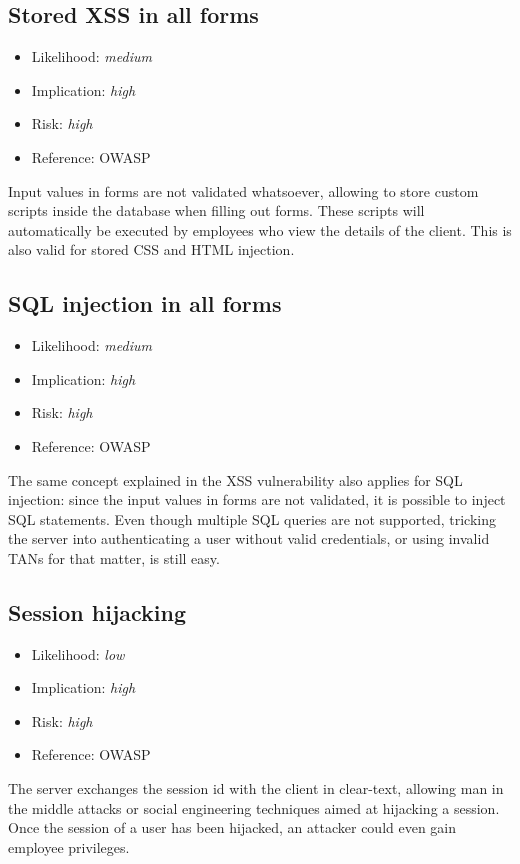 \subsection{Stored XSS in all forms} \label{over:xss}
\begin{itemize}
	\item Likelihood: \textit{medium}
	\item Implication: \textit{high}
	\item Risk: \textit{high}
	\item Reference: OWASP 
\end{itemize}
Input values in forms are not validated whatsoever, allowing to store custom scripts inside the database when filling out forms. These scripts will automatically be executed by employees who view the details of the client. This is also valid for stored CSS and HTML injection.

\subsection{SQL injection in all forms} \label{over:sql}
\begin{itemize}
	\item Likelihood: \textit{medium}
	\item Implication: \textit{high}
	\item Risk: \textit{high}
	\item Reference: OWASP 
\end{itemize}
The same concept explained in the XSS vulnerability also applies for SQL injection: since the input values in forms are not validated, it is possible to inject SQL statements. Even though multiple SQL queries are not supported, tricking the server into authenticating a user without valid credentials, or using invalid TANs for that matter, is still easy.

\subsection{Session hijacking} \label{over:session}
\begin{itemize}
	\item Likelihood: \textit{low}
	\item Implication: \textit{high}
	\item Risk: \textit{high}
	\item Reference: OWASP 
\end{itemize}
The server exchanges the session id with the client in clear-text, allowing man in the middle attacks or social engineering techniques aimed at hijacking a session. Once the session of a user has been hijacked, an attacker could even gain employee privileges.

